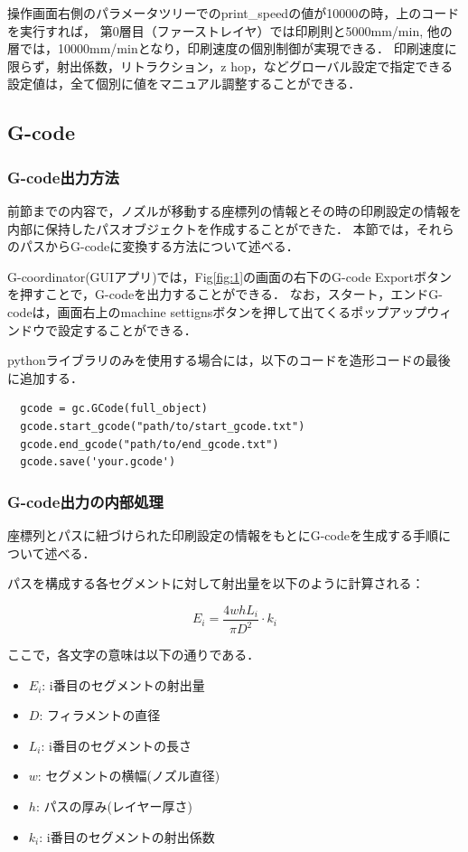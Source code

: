 \documentclass{article}
\begin{document}
\begin{twocolumn}
\begin{itemize}
操作画面右側のパラメータツリーでのprint\_speedの値が10000の時，上のコードを実行すれば，
第0層目（ファーストレイヤ）では印刷則と5000mm/min, 他の層では，10000mm/minとなり，印刷速度の個別制御が実現できる．
印刷速度に限らず，射出係数，リトラクション，z hop，などグローバル設定で指定できる設定値は，全て個別に値をマニュアル調整することができる．

\subsection{G-code}
\subsubsection{G-code出力方法}
前節までの内容で，ノズルが移動する座標列の情報とその時の印刷設定の情報を内部に保持したパスオブジェクトを作成することができた．
本節では，それらのパスからG-codeに変換する方法について述べる．

G-coordinator(GUIアプリ)では，Fig\ref{fig:1}の画面の右下のG-code Exportボタンを押すことで，G-codeを出力することができる．
なお，スタート，エンドG-codeは，画面右上のmachine settignsボタンを押して出てくるポップアップウィンドウで設定することができる．

pythonライブラリのみを使用する場合には，以下のコードを造形コードの最後に追加する．

\begin{lstlisting}
  gcode = gc.GCode(full_object)
  gcode.start_gcode("path/to/start_gcode.txt")
  gcode.end_gcode("path/to/end_gcode.txt")
  gcode.save('your.gcode')
\end{lstlisting}

\subsubsection{G-code出力の内部処理}
座標列とパスに紐づけられた印刷設定の情報をもとにG-codeを生成する手順について述べる．

パスを構成する各セグメントに対して射出量を以下のように計算される\cite{akhoundi2020calculating}：

\begin{equation}
  E_{i}=\frac{4 w h L_{i}}{\pi D^{2}} \cdot k_{i}
\end{equation}

ここで，各文字の意味は以下の通りである．
\begin{itemize}
  \item $E_{i}$: i番目のセグメントの射出量
  \item $D$: フィラメントの直径
  \item $L_{i}$: i番目のセグメントの長さ
  \item $w$: セグメントの横幅(ノズル直径)
  \item $h$: パスの厚み(レイヤー厚さ)
  \item $k_{i}$: i番目のセグメントの射出係数
\end{itemize}




\end{itemize}
\end{twocolumn}
\end{document}
